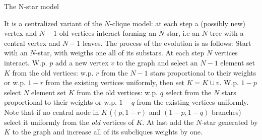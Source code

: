 \begin{block}{The N-star model}\small
  
  It is a centralized variant of the $N$-clique model: at each step a (possibly new) vertex and $N-1$ old vertices interact forming an $N$-star, i.e an $N$-tree with a central vertex and $N-1$ leaves.
  The process of the evolution is as follows: Start with an $N$-star, with weigths one all of its substars. At each step $N$ vertices interact. W.p. $p$ add a new vertex $v$ to the graph and select an $N-1$ element set $K$ from the old vertices: w.p. $r$ from the $N-1$ stars proportional to their weights or w.p. $1-r$ from the existing vertices uniformly, then set $K=K\cup{v}$. W.p. $1-p$ select $N$ element set $K$ from the old vertices: w.p. $q$ select from the $N$ stars proportional to their weights or w.p. $1-q$ from the existing vertices uniformly.  Note that if no central node in $K$ ($(p,1-r)$ and $(1-p,1-q)$ branches) select it uniformly from the {\small\it old} vertices of $K$. At last add the $N$-star generated by $K$ to the graph and increase all of its subcliques weights by one.
\end{block}
